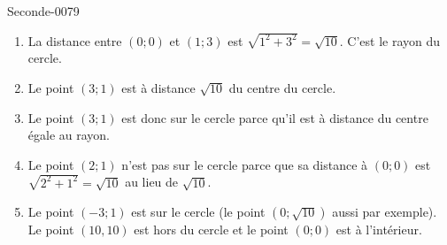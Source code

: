 
\begin{corrige}{Seconde-0079}

    \begin{enumerate}
        \item
            La distance entre \( (0;0)\) et \( (1;3)\) est \( \sqrt{1^2+3^2}=\sqrt{10}\). C'est le rayon du cercle.
        \item
            Le point \( (3;1)\) est à distance \( \sqrt{10}\) du centre du cercle.
        \item
            Le point \( (3;1)\) est donc sur le cercle parce qu'il est à distance du centre égale au rayon.
        \item
            Le point \( (2;1)\) n'est pas sur le cercle parce que sa distance à \( (0;0)\) est \( \sqrt{2^2+1^2}=\sqrt{10}\) au lieu de \( \sqrt{10}\).
        \item
            Le point \( (-3;1)\) est sur le cercle (le point \( (0;\sqrt{10})\) aussi par exemple). Le point \( (10,10)\) est hors du cercle et le point \( (0;0)\) est à l'intérieur.
    \end{enumerate}

\end{corrige}
